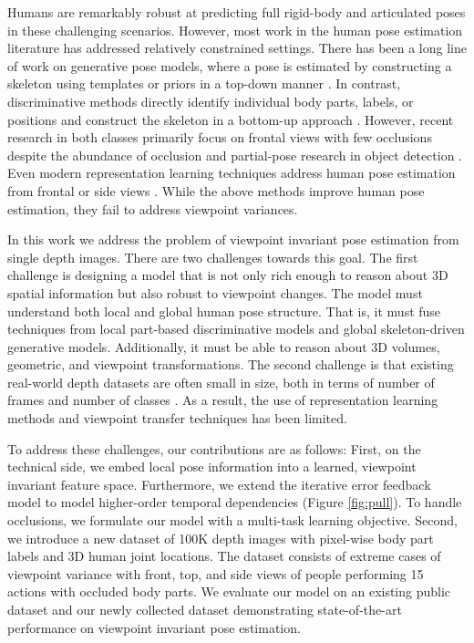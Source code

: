 \documentclass[runningheads]{llncs}
\begin{document}
	Humans are remarkably robust at predicting full rigid-body and articulated poses in these challenging scenarios. However, most work in the human pose estimation literature has addressed relatively constrained settings. There has been a long line of work on generative pose models, where a pose is estimated by constructing a skeleton using templates or priors in a top-down manner \cite{felzenszwalb2005pictorial,dantone2013human,eichner20122d,felzenszwalb2010object}. In contrast, discriminative methods directly identify individual body parts, labels, or positions and construct the skeleton in a bottom-up approach \cite{pishchulin2013poselet,pishchulin2013strong,eichner2012appearance,sapp2013modec,eichner2009better}.
	However, recent research in both classes primarily focus on frontal views with few occlusions despite the abundance of occlusion and partial-pose research in object detection \cite{rafi2015semantic,wang2013learning,azizpour2012object,ghiasi2014parsing,hsiao2014occlusion,bonde2014robust,alahi2014robust,alahi2008object,alahi2009sparsity,gao2011segmentation}.
	Even modern representation learning techniques address human pose estimation from frontal or side views \cite{li2015heterogeneous,fan2015combining,li2015maximum,tompson2014joint,jain2013learning,toshev2014deeppose,carreira2015human}. While the above methods improve human pose estimation, they fail to address viewpoint variances.

	In this work we address the problem of viewpoint invariant pose estimation from single depth images.
	There are two challenges towards this goal.
	The first challenge is designing a model that is not only rich enough to reason about 3D spatial information but also robust to viewpoint changes. The model must understand both local and global human pose structure.
	That is, it must fuse techniques from local part-based discriminative models and global skeleton-driven generative models. Additionally, it must be able to reason about 3D volumes, geometric, and viewpoint transformations.
	The second challenge is that existing real-world depth datasets are often small in size, both in terms of number of frames and number of classes \cite{ganapathi2012real,ganapathi2010real}. As a result, the use of representation learning methods and viewpoint transfer techniques has been limited.

	To address these challenges, our contributions are as follows: First, on the technical side, we embed local pose information into a learned, viewpoint invariant feature space.
	Furthermore, we extend the iterative error feedback model \cite{carreira2015human} to model higher-order temporal dependencies (Figure \ref{fig:pull}).
	To handle occlusions, we formulate our model with a multi-task learning objective.
	Second, we introduce a new dataset of 100K depth images with pixel-wise body part labels and 3D human joint locations. The dataset consists of extreme cases of viewpoint variance with front, top, and side views of people performing 15 actions with occluded body parts.
	We evaluate our model on an existing public dataset \cite{ganapathi2012real} and our newly collected dataset demonstrating state-of-the-art performance on viewpoint invariant pose estimation.
\end{document}
